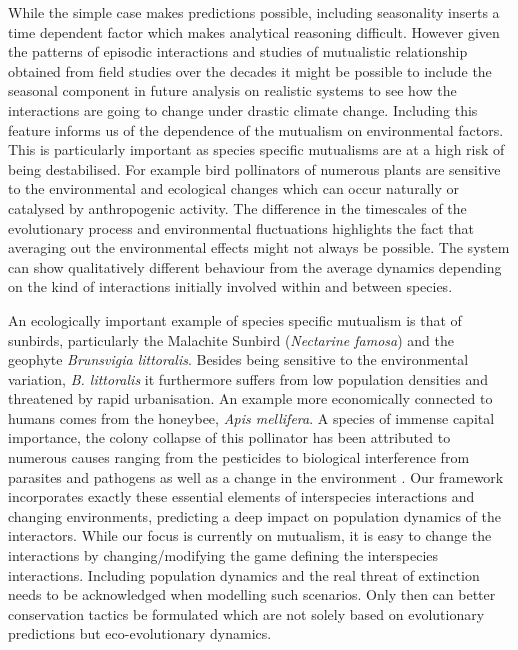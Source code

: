 \documentclass[12pt]{article}
\begin{document}
While the simple case makes predictions possible, including seasonality inserts a time dependent factor which makes analytical reasoning difficult.
However given the patterns of episodic interactions and studies of mutualistic relationship obtained from field studies over the decades it might be possible to include the seasonal component in future analysis on realistic systems to see how the interactions are going to change under drastic climate change.
Including this feature informs us of the dependence of the mutualism on environmental factors.
This is particularly important as species specific mutualisms are at a high risk of being destabilised.
For example bird pollinators of numerous plants are sensitive to the environmental and ecological changes which can occur naturally or catalysed by anthropogenic activity.
The difference in the timescales of the evolutionary process and environmental fluctuations highlights the fact that averaging out the environmental effects might not always be possible.
The system can show qualitatively different behaviour from the average dynamics depending on the kind of interactions initially involved within and between species.


An ecologically important example of species specific mutualism is that of sunbirds, particularly the Malachite Sunbird (\textit{Nectarine famosa}) and the geophyte \textit{Brunsvigia littoralis}.
Besides being sensitive to the environmental variation, \textit{B. littoralis} it furthermore suffers from low population densities \citep{geerts:SAJB:2012} and threatened by rapid urbanisation.
An example more economically connected to humans comes from the honeybee, \textit{Apis mellifera}.
A species of immense capital importance, the colony collapse of this pollinator has been attributed to numerous causes ranging from the pesticides to biological interference from parasites and pathogens as well as a change in the environment \citep{nazzi:PLosPath:2012}.
Our framework incorporates exactly these essential elements of interspecies interactions and changing environments, predicting a deep impact on population dynamics of the interactors.
While our focus is currently on mutualism, it is easy to change the interactions by changing/modifying the game defining the interspecies interactions.
Including population dynamics and the real threat of extinction needs to be acknowledged when modelling such scenarios.
Only then can better conservation tactics be formulated which are not solely based on evolutionary predictions but eco-evolutionary dynamics.
\end{document}
